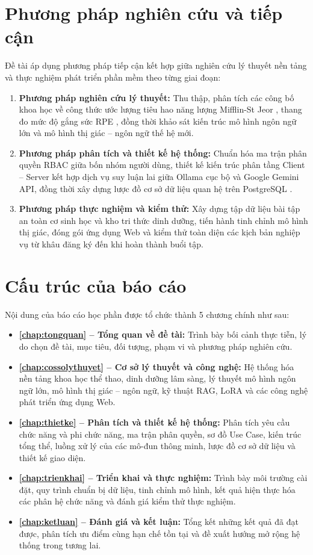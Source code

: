 \section{Phương pháp nghiên cứu và tiếp cận}
\label{sec:phuongphap}

Đề tài áp dụng phương pháp tiếp cận kết hợp giữa nghiên cứu lý thuyết nền tảng và thực nghiệm phát triển phần mềm theo từng giai đoạn:
\begin{enumerate}[label=\arabic*)]
    \item \textbf{Phương pháp nghiên cứu lý thuyết:} Thu thập, phân tích các công bố khoa học về công thức ước lượng tiêu hao năng lượng Mifflin-St Jeor \cite{mifflin1990new}, thang đo mức độ gắng sức RPE \cite{helms2016rpe}, đồng thời khảo sát kiến trúc mô hình ngôn ngữ lớn và mô hình thị giác -- ngôn ngữ thế hệ mới.
    \item \textbf{Phương pháp phân tích và thiết kế hệ thống:} Chuẩn hóa ma trận phân quyền RBAC giữa bốn nhóm người dùng, thiết kế kiến trúc phân tầng Client -- Server kết hợp dịch vụ suy luận lai giữa Ollama cục bộ và Google Gemini API, đồng thời xây dựng lược đồ cơ sở dữ liệu quan hệ trên PostgreSQL \cite{postgresql2026docs}.
    \item \textbf{Phương pháp thực nghiệm và kiểm thử:} Xây dựng tập dữ liệu bài tập an toàn cơ sinh học và kho tri thức dinh dưỡng, tiến hành tinh chỉnh mô hình thị giác, đóng gói ứng dụng Web và kiểm thử toàn diện các kịch bản nghiệp vụ từ khâu đăng ký đến khi hoàn thành buổi tập.
\end{enumerate}

\section{Cấu trúc của báo cáo}
\label{sec:cautruc}

Nội dung của báo cáo học phần được tổ chức thành 5 chương chính như sau:
\begin{itemize}[leftmargin=1.5cm]
    \item \textbf{\cref{chap:tongquan} -- Tổng quan về đề tài:} Trình bày bối cảnh thực tiễn, lý do chọn đề tài, mục tiêu, đối tượng, phạm vi và phương pháp nghiên cứu.
    \item \textbf{\cref{chap:cossolythuyet} -- Cơ sở lý thuyết và công nghệ:} Hệ thống hóa nền tảng khoa học thể thao, dinh dưỡng lâm sàng, lý thuyết mô hình ngôn ngữ lớn, mô hình thị giác -- ngôn ngữ, kỹ thuật RAG, LoRA và các công nghệ phát triển ứng dụng Web.
    \item \textbf{\cref{chap:thietke} -- Phân tích và thiết kế hệ thống:} Phân tích yêu cầu chức năng và phi chức năng, ma trận phân quyền, sơ đồ Use Case, kiến trúc tổng thể, luồng xử lý của các mô-đun thông minh, lược đồ cơ sở dữ liệu và thiết kế giao diện.
    \item \textbf{\cref{chap:trienkhai} -- Triển khai và thực nghiệm:} Trình bày môi trường cài đặt, quy trình chuẩn bị dữ liệu, tinh chỉnh mô hình, kết quả hiện thực hóa các phân hệ chức năng và đánh giá kiểm thử thực nghiệm.
    \item \textbf{\cref{chap:ketluan} -- Đánh giá và kết luận:} Tổng kết những kết quả đã đạt được, phân tích ưu điểm cùng hạn chế tồn tại và đề xuất hướng mở rộng hệ thống trong tương lai.
\end{itemize}
